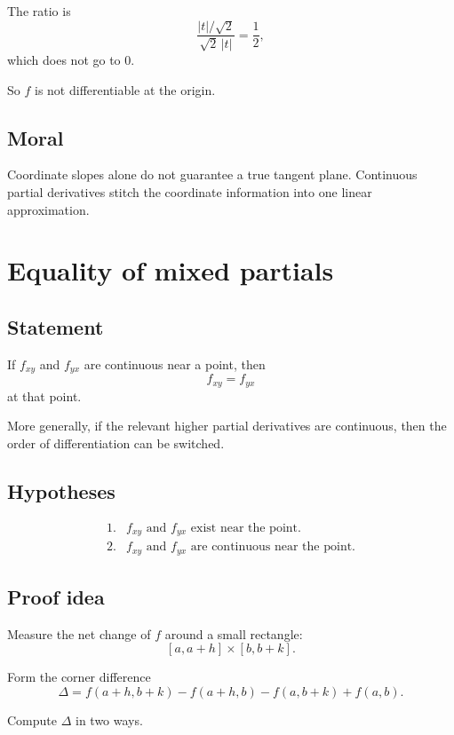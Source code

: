 The ratio is
\[
    \frac{|t|/\sqrt2}{\sqrt2\,|t|}=\frac12,
\]
which does not go to \(0\).

So \(f\) is not differentiable at the origin.

\subsection*{Moral}

Coordinate slopes alone do not guarantee a true tangent plane.  Continuous partial
derivatives stitch the coordinate information into one linear approximation.

\section{Equality of mixed partials}
\label{app:F.2}

\subsection*{Statement}

If \(f_{xy}\) and \(f_{yx}\) are continuous near a point, then
\[
\boxed{
    f_{xy}=f_{yx}
}
\]
at that point.

More generally, if the relevant higher partial derivatives are continuous, then the order
of differentiation can be switched.

\subsection*{Hypotheses}

\[
\begin{array}{ll}
1. & f_{xy}\text{ and }f_{yx}\text{ exist near the point.}\\[1mm]
2. & f_{xy}\text{ and }f_{yx}\text{ are continuous near the point.}
\end{array}
\]

\subsection*{Proof idea}

Measure the net change of \(f\) around a small rectangle:
\[
    [a,a+h]\times[b,b+k].
\]

Form the corner difference
\[
\boxed{
    \Delta
    =
    f(a+h,b+k)-f(a+h,b)-f(a,b+k)+f(a,b).
}
\]

Compute \(\Delta\) in two ways.

